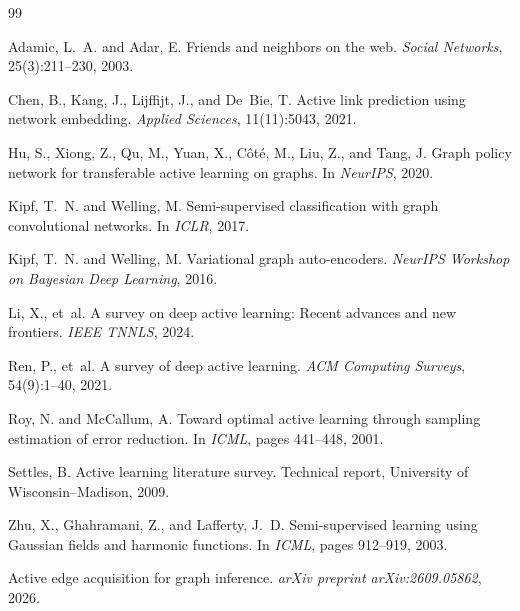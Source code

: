 \documentclass[12pt,a4paper,oneside]{report}
\begin{document}

\begin{thebibliography}{99}

Adamic, L.~A. and Adar, E.
\newblock Friends and neighbors on the web.
\newblock \emph{Social Networks}, 25(3):211--230, 2003.

Chen, B., Kang, J., Lijffijt, J., and De~Bie, T.
\newblock Active link prediction using network embedding.
\newblock \emph{Applied Sciences}, 11(11):5043, 2021.

Hu, S., Xiong, Z., Qu, M., Yuan, X., C\^{o}t\'{e}, M., Liu, Z., and Tang, J.
\newblock Graph policy network for transferable active learning on graphs.
\newblock In \emph{NeurIPS}, 2020.

Kipf, T.~N. and Welling, M.
\newblock Semi-supervised classification with graph convolutional networks.
\newblock In \emph{ICLR}, 2017.

Kipf, T.~N. and Welling, M.
\newblock Variational graph auto-encoders.
\newblock \emph{NeurIPS Workshop on Bayesian Deep Learning}, 2016.

Li, X., et~al.
\newblock A survey on deep active learning: Recent advances and new frontiers.
\newblock \emph{IEEE TNNLS}, 2024.

Ren, P., et~al.
\newblock A survey of deep active learning.
\newblock \emph{ACM Computing Surveys}, 54(9):1--40, 2021.

Roy, N. and McCallum, A.
\newblock Toward optimal active learning through sampling estimation of error reduction.
\newblock In \emph{ICML}, pages 441--448, 2001.

Settles, B.
\newblock Active learning literature survey.
\newblock Technical report, University of Wisconsin--Madison, 2009.

Zhu, X., Ghahramani, Z., and Lafferty, J.~D.
\newblock Semi-supervised learning using {G}aussian fields and harmonic functions.
\newblock In \emph{ICML}, pages 912--919, 2003.

Active edge acquisition for graph inference.
\newblock \emph{arXiv preprint arXiv:2609.05862}, 2026.


\end{thebibliography}
\end{document}
